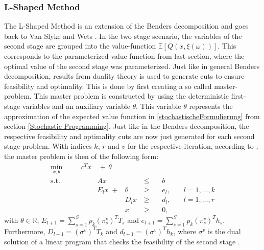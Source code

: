 \subsubsection{L-Shaped Method} \label{L-Shaped Methode}
The L-Shaped Method is an extension of the Benders decomposition and goes back to Van Slyke and Wets \cite{LShapedVanSlyke}.
In the two stage scenario, the variables of the second stage are grouped into the value-function $\mathbb{E}[Q(x, \xi(\omega))]$. This corresponds to the parameterized value function from last section, where the optimal value of the second stage was parameterized.
Just like in general Benders decomposition, results from duality theory is used to generate cuts to ensure feasibility and optimality.
This is done by first creating a so called master-problem. This master problem is constructed by using the deterministic first-stage variables and an auxiliary variable $\theta$.
This variable $\theta$ represents the approximation of the expected value function in \ref{stochastischeFormulierung} from section \ref{Stochastic Programming}.
Just like in the Benders decomposition, the respective feasibility and optimality cuts are now just generated for each second stage problem. 
With indices $k$, $r$ and $v$ for the respective iteration, according to \cite{BirgeLouveaux}, the master problem is then of the following form:
\begin{subequations}\label{L_Shaped}
    \begin{alignat}{7}
          \underset{x,\theta}{\min}&\quad&c^T  x&\,+\,\theta&  &             &&              \quad&\\
          \textrm{s.t.}            &\quad&    &    A x   &        &\, \leq \,&& b            \quad&\\ 
                                   &\quad&    &E_l x \;+ & \theta &\, \geq \,&& e_l,  \quad&  l=1,\dots,k \\
                                   &\quad&    &          & D_l x  &\, \geq \,&& d_l,  \quad&  l=1,\dots,r \\
                                   &\quad&    &          & x      &\, \geq \,&&0,                  &
    \end{alignat}
\end{subequations}
with $\theta \in \mathbb{R}$, $E_{l+1}= \sum^{S}_{s=1} p_k (\pi^v_s)^T T_s  $ and $e_{l+1} = \sum^{S}_{s=1} p_k (\pi^v_s)^T  h_s$.
Furthermore, $D_{l+1} = (\sigma^v)^T T_k$ and $d_{l+1} = (\sigma^v)^T h_k$, where $\sigma^v$ is the dual solution of a linear program that checks the feasibility of the second stage \cite{BirgeLouveaux}.
